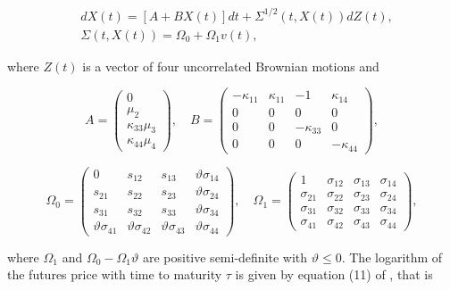 \documentclass{article}
\begin{document}
\begin{align*}
    &d{X}(t) = \left[ A + B {X}(t) \right] dt + \Sigma^{1/2}(t,X(t)) d{Z}(t), \\
    &\Sigma(t,X(t)) = \Omega_0 + \Omega_1 v(t),
\end{align*}

\noindent where ${Z}(t)$ is a vector of four uncorrelated Brownian motions and 

\begin{equation*}
    A = \begin{pmatrix}
        0 \\
        {\mu}_2 \\
        {\kappa}_{33}{\mu}_3\\
        {\kappa}_{44}{\mu}_4
    \end{pmatrix}, \quad 
    B = \begin{pmatrix}
        - {\kappa}_{11} & \kappa_{11} & -1 & \kappa_{14} \\
        0 & 0 & 0 & 0 \\
        0 & 0 & - {\kappa}_{33} & 0 \\
        0 & 0 & 0 & - {\kappa}_{44}
    \end{pmatrix},
\end{equation*} 

\begin{equation*}
    \Omega_0 = 
    \begin{pmatrix}
        0 & s_{12} & s_{13} & \vartheta \sigma_{14} \\
        s_{21} & s_{22} & s_{23} & \vartheta \sigma_{24} \\
        s_{31} & s_{32} & s_{33} & \vartheta \sigma_{34} \\ 
        \vartheta \sigma_{41} & \vartheta \sigma_{42} & \vartheta \sigma_{43} & \vartheta \sigma_{44}
    \end{pmatrix}, \quad \Omega_1 = \begin{pmatrix}
        1 & \sigma_{12} & \sigma_{13} & \sigma_{14} \\
        \sigma_{21} & \sigma_{22} & \sigma_{23} & \sigma_{24} \\
        \sigma_{31} & \sigma_{32} & \sigma_{33} & \sigma_{34} \\
        \sigma_{41} & \sigma_{42} & \sigma_{43} & \sigma_{44}
    \end{pmatrix},
\end{equation*}

\noindent where $\Omega_1$ and $\Omega_0 - \Omega_1 \vartheta$ are positive semi-definite with $\vartheta \leq 0$. The logarithm of the futures price with time to maturity $\tau$ is given by equation (11) of \cite{spinler17}, that is
\end{document}
